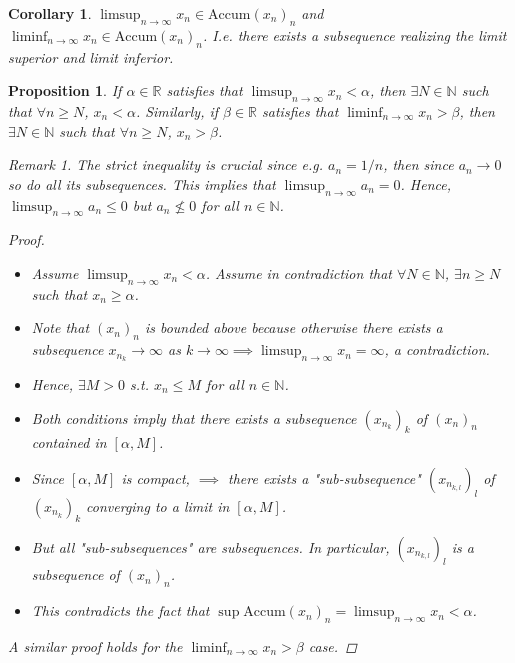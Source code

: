 \documentclass[10pt]{article}
\newcommand{\N}{\mathbb{N}}
\newcommand{\R}{\mathbb{R}}
\newtheorem{corollary}[theorem]{Corollary}
\newtheorem{proposition}[theorem]{Proposition}
\theoremstyle{definition}
\theoremstyle{remark}
\newtheorem*{remark}{Remark}
\begin{document}
\begin{corollary}
    $\limsup_{n \to \infty} x_n \in \text{Accum}(x_n)_n$ and $\liminf_{n \to \infty} x_n \in \text{Accum}(x_n)_n$.
    I.e. there exists a subsequence realizing the limit superior and limit inferior.
\end{corollary}

\begin{proposition}
    If $\alpha \in \R$ satisfies that $\limsup_{n \to \infty} x_n < \alpha$, then $\exists N \in \N$ such that $\forall n \geq N$, $x_n < \alpha$.
    Similarly, if $\beta \in \R$ satisfies that $\liminf_{n \to \infty} x_n > \beta$, then $\exists N \in \N$ such that $\forall n \geq N$, $x_n > \beta$.

    \begin{remark}
        The strict inequality is crucial since e.g. $a_n = 1/n$, then since $a_n \to 0$ so do all its subsequences.
        This implies that $\limsup_{n \to \infty} a_n = 0$.
        Hence, $\limsup_{n \to \infty} a_n \leq 0$ but $a_n \not\leq 0$ for all $n \in \N$.
    \end{remark}
    \begin{proof}
        \hfill
        \begin{itemize}
            \item Assume $\limsup_{n \to \infty} x_n < \alpha$. Assume in contradiction that $\forall N \in \N$, $\exists n \geq N$ such that $x_n \geq \alpha$.
            \item Note that $(x_n)_n$ is bounded above because otherwise there exists a subsequence
                $x_{n_k} \to \infty$ as $k \to \infty \implies \limsup_{n \to \infty} x_n = \infty$, a contradiction.
            \item Hence, $\exists M > 0$ s.t. $x_n \leq M$ for all $n \in \N$.
            \item Both conditions imply that there exists a subsequence $(x_{n_k})_k$ of $(x_n)_n$ contained in $[\alpha, M]$.
            \item Since $[\alpha, M]$ is compact, $\implies$ there exists a "sub-subsequence" $(x_{n_{k, l}})_l$ of $(x_{n_k})_k$ converging to a limit in $[\alpha, M]$.
            \item But all "sub-subsequences" are subsequences. In particular, $(x_{n_{k, l}})_l$ is a subsequence of $(x_n)_n$.
            \item This contradicts the fact that $\sup \text{Accum}(x_n)_n = \limsup_{n \to \infty} x_n < \alpha$.
        \end{itemize}
        A similar proof holds for the $\liminf_{n \to \infty} x_n > \beta$ case.
    \end{proof}
\end{proposition}
\end{document}
